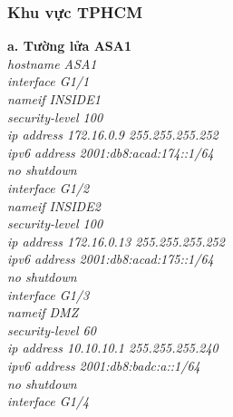 \documentclass[12pt,a4paper]{report}
\begin{document}
\subsubsection{Khu vực TPHCM }
\hspace*{1cm}\textbf{a. Tường lửa ASA1}\\
\hspace*{2cm}\textit{hostname ASA1\\
\hspace*{2cm}interface G1/1\\
\hspace*{2cm}nameif INSIDE1\\
\hspace*{2cm}security-level 100\\
\hspace*{2cm}ip address 172.16.0.9 255.255.255.252\\
\hspace*{2cm}ipv6 address 2001:db8:acad:174::1/64\\
\hspace*{2cm}no shutdown\\
\hspace*{2cm}interface G1/2\\
\hspace*{2cm}nameif INSIDE2\\
\hspace*{2cm}security-level 100\\
\hspace*{2cm}ip address 172.16.0.13 255.255.255.252\\
\hspace*{2cm}ipv6 address 2001:db8:acad:175::1/64\\
\hspace*{2cm}no shutdown\\
\hspace*{2cm}interface G1/3\\
\hspace*{2cm}nameif DMZ\\
\hspace*{2cm}security-level 60\\
\hspace*{2cm}ip address 10.10.10.1 255.255.255.240\\
\hspace*{2cm}ipv6 address 2001:db8:badc:a::1/64\\
\hspace*{2cm}no shutdown\\
\hspace*{2cm}interface G1/4\\
}
\end{document}
